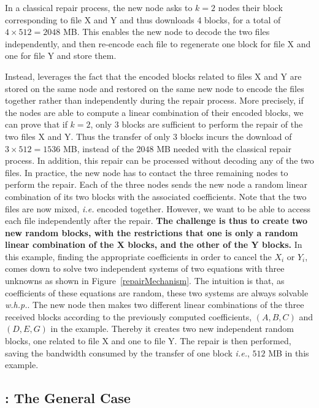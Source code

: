 In a classical repair process, the new node asks to $k=2$ nodes their block corresponding to file X and Y and thus downloads 4 blocks, for a total of $4\times512=2048$ MB. This enables the new node to  decode the two files independently, and then re-encode each file to regenerate one block for file X and one for file Y and store them.  

Instead, \crc  leverages the fact that the encoded blocks related to files X and Y are stored on the same node and restored on the same new node to encode the files together rather than independently during the repair process. More precisely, if the nodes are able to compute a linear combination of their encoded blocks, we can prove that if $k=2$, only 3 blocks are sufficient to perform the repair of the two files X and Y. Thus the transfer of only $3$ blocks incurs the download of $3\times512=1536$ MB, instead of the $2048$ MB needed with the classical repair process.  In addition, this repair can be processed without decoding any of the two files. In practice, the new node has to contact the three remaining nodes to perform the repair. Each of the three nodes sends the new node a random linear combination of its two blocks with the associated coefficients. Note that the two files are now mixed, \textit{i.e.} encoded together. However, we want to be able to access each file independently after the repair. \textbf{The challenge is thus to create two new random blocks, with the restrictions that one is only a random linear combination of the X blocks, and the other of the Y blocks.}
In this example, finding the appropriate coefficients in order to cancel the $X_i$ or $Y_i$,  comes down to solve two independent systems of two equations with three unknowns as shown in Figure~\ref{repairMechanism}. The intuition is that, as coefficients of these equations are random, these two systems are always solvable \textit{w.h.p.}. The new node then makes two different linear combinations of the three received blocks according to the previously computed coefficients, $(A,B,C)$ and $(D,E,G)$ in the example. Thereby it creates two new independent random blocks, one related to file X and one to file Y. The repair is then performed, saving the bandwidth consumed by the transfer of one block \emph{i.e.}, $512$ MB in this example. 

\subsection{\crc: The General Case}
\label{generalCase}



